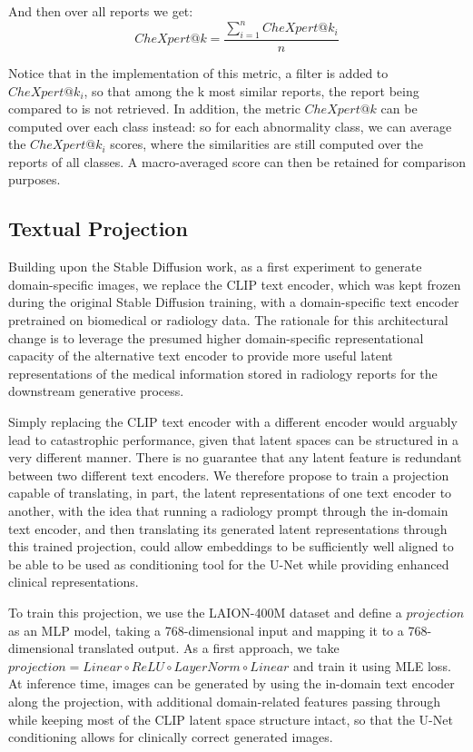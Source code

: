 \documentclass{article}
\begin{document}
And then over all reports we get: 
$$
CheXpert@k = \frac{\sum_{i=1}^n CheXpert@k_i}{n}
$$

Notice that in the implementation of this metric, a filter is added to $CheXpert@k_i$, so that among the k most similar reports, the report being compared to is not retrieved. In addition, the metric $CheXpert@k$ can be computed over each class instead: so for each abnormality class, we can average the $CheXpert@k_i$ scores, where the similarities are still computed over the reports of all classes. A macro-averaged score can then be retained for comparison purposes.

\subsection{Textual Projection}
\label{textual-projection}

Building upon the Stable Diffusion work, as a first experiment to generate domain-specific images, we replace the CLIP text encoder, which was kept frozen during the original Stable Diffusion training, with a domain-specific text encoder pretrained on biomedical or radiology data. The rationale for this architectural change is to leverage the presumed higher domain-specific representational capacity of the alternative text encoder to provide more useful latent representations of the medical information stored in radiology reports for the downstream generative process.

Simply replacing the CLIP text encoder with a different encoder would arguably lead to catastrophic performance, given that latent spaces can be structured in a very different manner. There is no guarantee that any latent feature is redundant between two different text encoders. We therefore propose to train a projection capable of translating, in part, the latent representations of one text encoder to another, with the idea that running a radiology prompt through the in-domain text encoder, and then translating its generated latent representations through this trained projection, could allow embeddings to be sufficiently well aligned to be able to be used as conditioning tool for the U-Net while providing enhanced clinical representations.

To train this projection, we use the LAION-400M dataset and define a $projection$ as an MLP model, taking a 768-dimensional input and mapping it to a 768-dimensional translated output. As a first approach, we take $projection = Linear \circ ReLU \circ LayerNorm \circ Linear$ and train it using MLE loss. At inference time, images can be generated by using the in-domain text encoder along the projection, with additional domain-related features passing through while keeping most of the CLIP latent space structure intact, so that the U-Net conditioning allows for clinically correct generated images.
\end{document}
